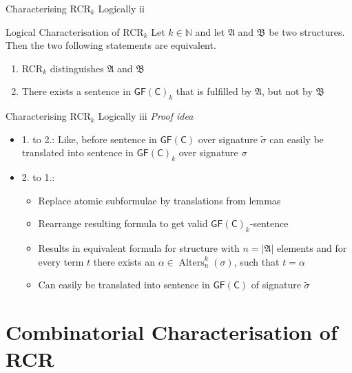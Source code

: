 \documentclass[aspectratio=169]{beamer}
\newcommand{\GFC}{\mathsf{GF}(\mathsf{C})}
\begin{document}
	\begin{frame}{Characterising RCR$_k$ Logically ii}
		\begin{block}{Logical Characterisation of RCR$_k$}
			Let $k\in\mathbb N$ and let $\mathfrak A$ and $\mathfrak B$ be two structures.
			Then the two following statements are equivalent.
			\begin{enumerate}
				\item RCR$_k$ distinguishes $\mathfrak A$ and $\mathfrak B$
				\item There exists a sentence in $\GFC_k$ that is fulfilled by $\mathfrak A$, but not by $\mathfrak B$
			\end{enumerate}
		\end{block}
	\end{frame}
	
	\begin{frame}{Characterising RCR$_k$ Logically iii}
		\emph{Proof idea}
		\begin{itemize}
			\item 1. to 2.: Like, before sentence in $\GFC$ over signature $\widetilde{\sigma}$ can easily be translated into sentence in $\GFC_k$ over signature $\sigma$
			\item 2. to 1.:
			\begin{itemize}
				\item Replace atomic subformulae by translations from lemmas
				\item Rearrange resulting formula to get valid $\GFC_k$-sentence
				\item Results in equivalent formula for structure with $n=\vert \mathfrak A \vert$ elements and for every term $t$ there exists an $\alpha\in\operatorname{Alters}^k_n(\sigma)$, such that $t=\alpha$
				\item Can easily be translated into sentence in $\GFC$ of signature $\widetilde{\sigma}$
			\end{itemize}
		\end{itemize}
	\end{frame}
	
	\section{Combinatorial Characterisation of RCR}
	
\end{document}
